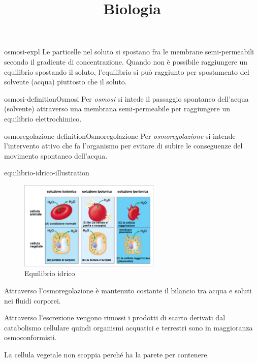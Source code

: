 \documentclass[preview]{standalone}
\begin{document}
\title{Biologia}
\genpage

\begin{snippet}{osmosi-expl}
    Le particelle nel soluto si spostano fra le membrane semi-permeabili secondo il gradiente
di concentrazione. Quando non è possibile raggiungere un equilibrio spostando il soluto,
l'equilibrio si può raggiunto per spostamento del solvente (acqua) piuttosto che il soluto.
\end{snippet}

\begin{snippetdefinition}{osmosi-definition}{Osmosi}
    Per \textit{osmosi} si intede il passaggio spontaneo dell'acqua (solvente) attraverso una membrana semi-permeabile
    per raggiungere un equilibrio elettrochimico.
\end{snippetdefinition}

\begin{snippetdefinition}{osmoregolazione-definition}{Osmoregolazione}
    Per \textit{osmoregolazione} si intende l'intervento attivo che fa l'organismo per evitare di subire le conseguenze del movimento spontaneo dell'acqua.
\end{snippetdefinition}

\begin{snippet}{equilibrio-idrico-illustration}
    \setlength{\intextsep}{0pt}%
    \begin{figure}
        \includegraphics[width=0.6\textwidth]{./resources/equilibrio_idrico.png}
        \caption{Equilibrio idrico}
        \vspace{-1cm}
    \end{figure}

    Attraverso l'osmoregolazione è mantenuto costante il bilancio tra acqua e soluti
    nei fluidi corporei.

    Attraverso l'escrezione vengono rimossi i prodotti di scarto
    derivati dal catabolismo cellulare quindi organismi acquatici e terrestri sono in
    maggioranza osmoconformisti.

    La cellula vegetale non scoppia perché ha la parete per contenere.

    \wrapfill
\end{snippet}
\end{document}
